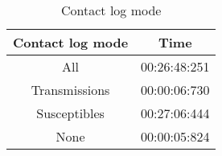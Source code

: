 \documentclass{article}
\begin{document}
\begin{table}[!h]
	\centering
	\begin{tabular}{|c|c|}
		\hline
		Contact log mode & Time \\\hline
   		All 			& 00:26:48:251 \\\hline
   		Transmissions 	& 00:00:06:730 \\\hline
   		Susceptibles 	& 00:27:06:444 \\\hline
   		None 			& 00:00:05:824 \\
    	\hline
	\end{tabular}
	\caption{Contact log mode}
\end{table}
\end{document}
